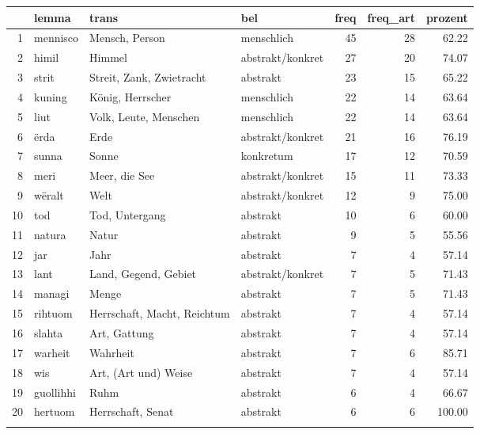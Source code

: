 \begin{tabular}{rlllrrr}
  \lsptoprule
 & lemma & trans & bel & freq & freq\_art & prozent \\ 
  \midrule
1 & mennisco & Mensch, Person & menschlich &  45 &  28 & 62.22 \\ 
  2 & himil & Himmel & abstrakt/konkret &  27 &  20 & 74.07 \\ 
  3 & strit & Streit, Zank, Zwietracht & abstrakt &  23 &  15 & 65.22 \\ 
  4 & kuning & König, Herrscher & menschlich &  22 &  14 & 63.64 \\ 
  5 & liut & Volk, Leute, Menschen & menschlich &  22 &  14 & 63.64 \\ 
  6 & ërda & Erde & abstrakt/konkret &  21 &  16 & 76.19 \\ 
  7 & sunna & Sonne & konkretum &  17 &  12 & 70.59 \\ 
  8 & meri & Meer, die See & abstrakt/konkret &  15 &  11 & 73.33 \\ 
  9 & wëralt & Welt & abstrakt/konkret &  12 &   9 & 75.00 \\ 
  10 & tod & Tod, Untergang & abstrakt &  10 &   6 & 60.00 \\ 
  11 & natura & Natur & abstrakt &   9 &   5 & 55.56 \\ 
  12 & jar & Jahr & abstrakt &   7 &   4 & 57.14 \\ 
  13 & lant & Land, Gegend, Gebiet & abstrakt/konkret &   7 &   5 & 71.43 \\ 
  14 & managi & Menge & abstrakt &   7 &   5 & 71.43 \\ 
  15 & rihtuom & Herrschaft, Macht, Reichtum & abstrakt &   7 &   4 & 57.14 \\ 
  16 & slahta & Art, Gattung & abstrakt &   7 &   4 & 57.14 \\ 
  17 & warheit & Wahrheit & abstrakt &   7 &   6 & 85.71 \\ 
  18 & wis & Art, (Art und) Weise & abstrakt &   7 &   4 & 57.14 \\ 
  19 & guollihhi & Ruhm & abstrakt &   6 &   4 & 66.67 \\ 
  20 & hertuom & Herrschaft, Senat & abstrakt &   6 &   6 & 100.00 \\ 
   \lspbottomrule
\end{tabular}
